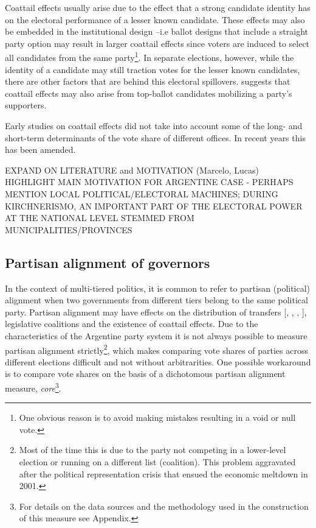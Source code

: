 \documentclass[a4paper,12pt]{article}
\begin{document}
Coattail effects usually arise due to the effect that a strong
candidate identity has on the electoral performance of a lesser known
candidate. These effects may also be embedded in the institutional
design --i.e ballot designs that include a straight
party option may result in larger coattail effects since voters are
induced to select all candidates from the same party\footnote{One
  obvious reason is to avoid making mistakes resulting in a void or
  null vote.}. In separate elections, however, while the identity of a
candidate may still traction votes for the lesser known candidates,
there are other factors that are behind this electoral spillovers.
\cite{meredith2013} suggests that coattail effects may also arise from
top-ballot candidates mobilizing a party's supporters.

Early studies on coattail effects did not take into account some of
the long- and short-term determinants of the vote share of different
offices. In recent years this has been amended.

EXPAND ON LITERATURE and MOTIVATION (Marcelo, Lucas)
HIGHLIGHT MAIN MOTIVATION FOR ARGENTINE CASE - PERHAPS MENTION LOCAL POLITICAL/ELECTORAL MACHINES; DURING KIRCHNERISMO, AN IMPORTANT PART OF THE ELECTORAL POWER AT THE NATIONAL LEVEL STEMMED FROM MUNICIPALITIES/PROVINCES

\subsection{Partisan alignment of governors}

In the context of multi-tiered politics, it is common to refer to
partisan (political) alignment when two governments from different tiers belong
to the same political party. Partisan alignment may have effects on
the distribution of transfers [\cite{larcinese2006}, \cite{sole2008},
\cite{lema2013}, \cite{migueis2013}], legislative coalitions and the
existence of coattail effects.  Due to the characteristics of the
Argentine party system it is not always possible to measure partisan
alignment strictly\footnote{Most of the
  time this is due to the party not competing in a lower-level
  election or running on a different list (coalition). This problem
  aggravated after the political representation crisis that ensued the
  economic meltdown in 2001.}, which makes comparing vote
shares of parties across different elections difficult and not without
arbitrarities. One possible workaround is to compare
vote shares on the basis of a dichotomous partisan alignment
measure, \textit{core}\footnote{For details on the data sources and
  the methodology used in the construction of this measure see Appendix.}.
\end{document}
